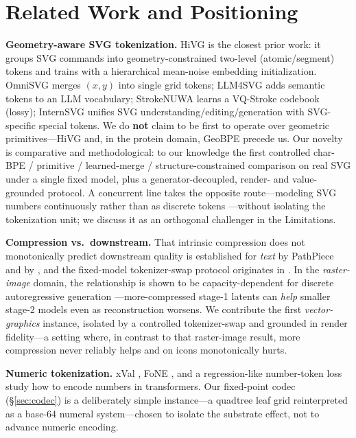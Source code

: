 \documentclass[11pt]{article}
\begin{document}
\section{Related Work and Positioning}
\textbf{Geometry-aware SVG tokenization.} HiVG \citep{hivg2026} is the closest prior work: it groups SVG commands into geometry-constrained two-level (atomic/segment) tokens and trains with a hierarchical mean-noise embedding initialization. OmniSVG \citep{omnisvg2025} merges \((x,y)\) into single grid tokens; LLM4SVG \citep{xing2024llm4svg} adds semantic tokens to an LLM vocabulary; StrokeNUWA \citep{strokenuwa2024} learns a VQ-Stroke codebook (lossy); InternSVG \citep{internsvg2025} unifies SVG understanding/editing/generation with SVG-specific special tokens. We do \textbf{not} claim to be first to operate over geometric primitives---HiVG and, in the protein domain, GeoBPE \citep{geobpe2026} precede us. Our novelty is comparative and methodological: to our knowledge the first controlled char-BPE / primitive / learned-merge / structure-constrained comparison on real SVG under a single fixed model, plus a generator-decoupled, render- and value-grounded protocol. A concurrent line takes the opposite route---modeling SVG numbers continuously rather than as discrete tokens \citep{ogezi2026cnm}---without isolating the tokenization unit; we discuss it as an orthogonal challenger in the Limitations.

\textbf{Compression vs.\ downstream.} That intrinsic compression does not monotonically predict downstream quality is established for \emph{text} by PathPiece \citep{schmidt2024pathpiece} and by \citet{lotz2025}, and the fixed-model tokenizer-swap protocol originates in \citet{ali2024tokenizer}. In the \emph{raster-image} domain, the relationship is shown to be capacity-dependent for discrete autoregressive generation \citep{raster2024compress}---more-compressed stage-1 latents can \emph{help} smaller stage-2 models even as reconstruction worsens. We contribute the first \emph{vector-graphics} instance, isolated by a controlled tokenizer-swap and grounded in render fidelity---a setting where, in contrast to that raster-image result, more compression never reliably helps and on icons monotonically hurts.

\textbf{Numeric tokenization.} xVal \citep{xval2023}, FoNE \citep{fone2025}, and a regression-like number-token loss \citep{ntl2025} study how to encode numbers in transformers. Our fixed-point codec (\S\ref{sec:codec}) is a deliberately simple instance---a quadtree leaf grid reinterpreted as a base-64 numeral system---chosen to isolate the substrate effect, not to advance numeric encoding.
\end{document}
